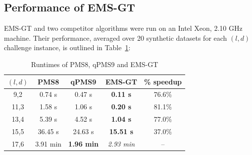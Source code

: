 \documentclass{acm_proc_article-sp}
\begin{document}

	\newpage
	\subsection{Performance of EMS-GT}
		EMS-GT and two competitor algorithms were run on an Intel Xeon, 2.10 GHz machine. Their performance, averaged over 20 synthetic datasets for each $(l,d)$ challenge instance, is outlined in Table~\ref{tbl:runtimes_v_pms}:

		\begin{table}[ht] %
			\small
			\renewcommand{\arraystretch}{1.3}
			\caption{\small Runtimes of PMS8, qPMS9 and EMS-GT}
			\label{tbl:runtimes_v_pms}
			\centering
			\begin{tabular}{|c|c|c|c|c|}
			\hline \bfseries\boldmath $(l,d)$ & \bfseries PMS8 & \bfseries qPMS9 & \bfseries EMS-GT & \bfseries \% speedup\\
			\hline
			 9,2 &  0.74 s  &  0.47 s & {\bf 0.11 s} & 76.6\%\\
			11,3 &  1.58 s  &  1.06 s & {\bf 0.20 s} & 81.1\%\\
			13,4 &  5.39 s  &  4.52 s & {\bf 1.04 s} & 77.0\%\\
			15,5 & 36.45 s  & 24.63 s & {\bf15.51 s} & 37.0\%\\
			17,6 &  3.91 min & \textbf{1.96 min} & {\emph{2.93 min}} & --\\
			\hline\end{tabular}
			\end{table}
\end{document}
